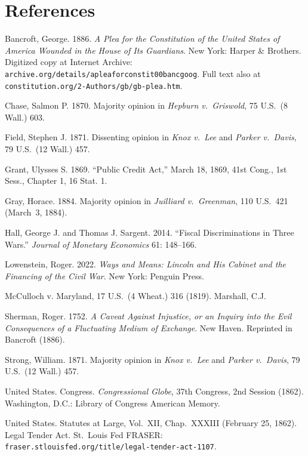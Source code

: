 \documentclass[12pt]{article}
\begin{document}
\section*{References}

\begin{description}
\setlength\itemsep{0.5em}

\item Bancroft, George. 1886. \textit{A Plea for the Constitution of the
United States of America Wounded in the House of Its Guardians}. New
York: Harper \& Brothers. Digitized copy at Internet Archive:
\texttt{archive.org/details/apleaforconstit00bancgoog}. Full text also
at \texttt{constitution.org/2-Authors/gb/gb-plea.htm}.

\item Chase, Salmon P. 1870. Majority opinion in \textit{Hepburn
v.\ Griswold}, 75 U.S.\ (8 Wall.) 603.

\item Field, Stephen J. 1871. Dissenting opinion in \textit{Knox v.\
Lee} and \textit{Parker v.\ Davis}, 79 U.S.\ (12 Wall.) 457.

\item Grant, Ulysses S. 1869. ``Public Credit Act,'' March 18, 1869,
41st Cong., 1st Sess., Chapter 1, 16 Stat. 1.

\item Gray, Horace. 1884. Majority opinion in \textit{Juilliard
v.\ Greenman}, 110 U.S.\ 421 (March~3, 1884).

\item Hall, George J. and Thomas J. Sargent. 2014. ``Fiscal
Discriminations in Three Wars.'' \textit{Journal of Monetary Economics}
61: 148--166.

\item Lowenstein, Roger. 2022. \textit{Ways and Means: Lincoln and His
Cabinet and the Financing of the Civil War}. New York: Penguin Press.

\item McCulloch v. Maryland, 17 U.S.\ (4 Wheat.) 316 (1819). Marshall,
C.J.

\item Sherman, Roger. 1752. \textit{A Caveat Against Injustice, or an
Inquiry into the Evil Consequences of a Fluctuating Medium of Exchange}.
New Haven. Reprinted in Bancroft (1886).

\item Strong, William. 1871. Majority opinion in \textit{Knox v.\ Lee}
and \textit{Parker v.\ Davis}, 79 U.S.\ (12 Wall.) 457.

\item United States. Congress. \textit{Congressional Globe}, 37th
Congress, 2nd Session (1862). Washington, D.C.: Library of Congress
American Memory.

\item United States. Statutes at Large, Vol.\ XII, Chap.\ XXXIII
(February 25, 1862). Legal Tender Act. St.\ Louis Fed FRASER:
\texttt{fraser.stlouisfed.org/title/legal-tender-act-1107}.

\end{description}
\end{document}
